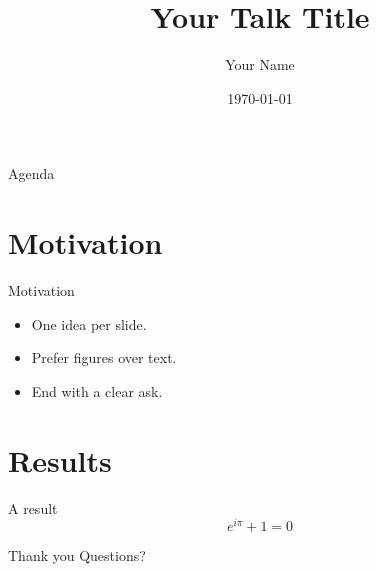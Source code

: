 \documentclass[aspectratio=169]{beamer}
\title{Your Talk Title}
\author{Your Name}
\date{\today}
\begin{document}
\begin{frame}
  \titlepage
\end{frame}

\begin{frame}{Agenda}
  \tableofcontents
\end{frame}

\section{Motivation}
\begin{frame}{Motivation}
  \begin{itemize}
    \item One idea per slide.
    \item Prefer figures over text.
    \item End with a clear ask.
  \end{itemize}
\end{frame}

\section{Results}
\begin{frame}{A result}
  \begin{equation*}
    e^{i\pi} + 1 = 0
  \end{equation*}
\end{frame}

\begin{frame}{Thank you}
  Questions?
\end{frame}
\end{document}
